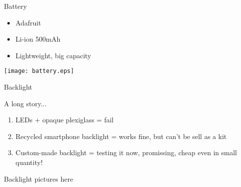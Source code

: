 \documentclass[compress,red]{beamer}
\begin{document}
\begin{frame}{Battery}

  \begin{block}{}
    \begin{itemize}
    \item Adafruit
    \item Li-ion 500mAh
    \item Lightweight, big capacity
    \end{itemize}
  \end{block}

  \begin{center}
    \texttt{[image: battery.eps]}
  \end{center}

  \note[item]{}

\end{frame}

\begin{frame}{Backlight}

  \begin{block}{A long story...}
    \begin{enumerate}
    \item LEDs + opaque plexiglass = fail
    \item Recycled smartphone backlight = works fine, but can't be sell as a kit
    \item Custom-made backlight = testing it now, promissing, cheap even in small quantity!
    \end{enumerate}
  \end{block}

  \begin{center}
    Backlight pictures here
  \end{center}

  \note[item]{}

\end{frame}
\end{document}
